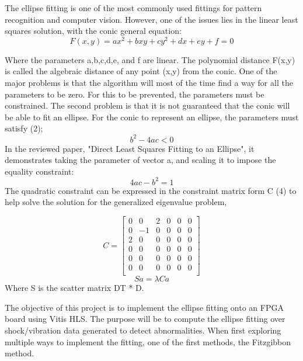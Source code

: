 \documentclass[11pt,a4paper]{article}
\begin{document}
The ellipse fitting is one of the most commonly used fittings for pattern recognition and computer vision. However, one of the issues lies in the linear least squares solution, with the conic general equation:
\begin{equation}
F(x,y) = ax^{2} + bxy + cy^{2} + dx + ey + f = 0   
\end{equation}

Where the parameters a,b,c,d,e, and f are linear. The polynomial distance F(x,y) is called the algebraic distance of any point (x,y) from the conic. One of the major problems is that the algorithm will most of the time find a way for all the parameters to be zero. For this to be prevented, the parameters must be constrained. The second problem is that it is not guaranteed that the conic will be able to fit an ellipse. For the conic to represent an ellipse, the parameters must satisfy (2);
\begin{equation}
    b^{2} - 4ac < 0
\end{equation}
In the reviewed paper, "Direct Least Squares Fitting to an Ellipse", it demonstrates taking the parameter of vector a, and scaling it to impose the equality constraint:
\begin{equation}
    4ac - b^{2} = 1
\end{equation}
The quadratic constraint can be expressed in the constraint matrix form C (4) to help solve the solution for the generalized eigenvalue problem,

\begin{equation}
    C = 
\begin{bmatrix}
0 & 0 & 2 & 0 & 0 & 0 \\
0 & -1 & 0 & 0 & 0 & 0 \\ 
2 & 0 & 0 & 0 & 0 & 0 \\ 
0 & 0 & 0 & 0 & 0 & 0 \\ 
0 & 0 & 0 & 0 & 0 & 0 \\ 
0 & 0 & 0 & 0 & 0 & 0 \\
\end{bmatrix}
\end{equation}
\begin{equation}
    Sa = \lambda Ca
\end{equation}
Where S is the scatter matrix DT * D.

The objective of this project is to implement the ellipse fitting onto an FPGA board using Vitis HLS. The purpose will be to compute the ellipse fitting over shock/vibration data generated to detect abnormalities. When first exploring multiple ways to implement the fitting, one of the first methods, the Fitzgibbon method.
\end{document}
